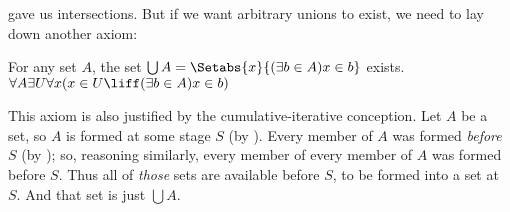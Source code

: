 \documentclass[../../../include/open-logic-section]{subfiles}
\begin{document}

 gave us intersections.
But if we want arbitrary unions to exist, we need to lay down another
axiom:

\begin{axiom}[Union] For any set $A$, the set $\bigcup A =
\Setabs{x}{(\exists b \in A) x \in b}$ exists.\\
	$\forall A \exists U \forall x(x \in U \liff (\exists b \in A)x \in b)$
\end{axiom}

This axiom is also justified by the cumulative-iterative conception.
Let $A$ be a set, so $A$ is formed at some stage $S$ (by \stageshier).
Every member of $A$ was formed \emph{before}  $S$ (by \stagesacc); so,
reasoning similarly, every member of every member of $A$ was formed
before $S$. Thus all of \emph{those} sets are available before $S$, to
be formed into a set at $S$. And that set is just $\bigcup A$.
\end{document}

